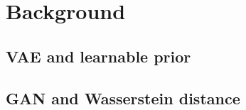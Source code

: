 \section{Background}

\subsection{VAE and learnable prior}

\subsection{GAN and Wasserstein distance}
